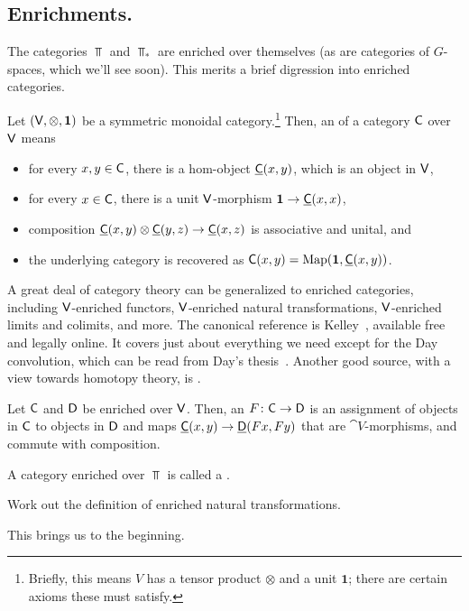 \subsection*{Enrichments.}
The categories $\Top$ and $\Top_*$ are enriched over themselves (as are categories of $G$-spaces, which we'll see
soon). This merits a brief digression into enriched categories.
\begin{defn}
Let $(\mathsf V,\otimes, \boldsymbol 1)$ be a symmetric monoidal
category.\footnote{Briefly, this means $V$ has a tensor product $\otimes$ and a unit $\boldsymbol 1$; there are
certain axioms these must satisfy.} Then, an  of a category $\mathsf C$ over $\mathsf V$
means
\begin{itemize}
	\item for every $x,y\in\mathsf C$, there is a hom-object $\underline{\mathsf C}(x,y)$, which is an object in $\mathsf V$,
	\item for every $x\in\mathsf C$, there is a unit $\mathsf V$-morphism $\boldsymbol 1\to\underline{\mathsf C}(x,x)$,
	\item composition $\underline{\mathsf C}(x,y)\otimes\underline{\mathsf C}(y,z)\to\underline{\mathsf C}(x,z)$ is associative and unital,
	and
	\item the underlying category is recovered as $\mathsf C(x,y) = \operatorname{Map}(\boldsymbol 1, \underline{\mathsf C}(x,y))$.
\end{itemize}
\end{defn}
A great deal of category theory can be generalized to enriched categories, including $\mathsf V$-enriched functors,
$\mathsf V$-enriched natural transformations, $\mathsf V$-enriched limits and colimits, and more. The canonical reference is
Kelley~\cite{Kelley}, available free and legally online. It covers just about everything we need except for the Day
convolution, which can be read from Day's thesis~\cite{DayThesis}. Another good source, with
a view towards homotopy theory, is \cite[Chapter 3]{RiehlCHT}.
\begin{defn}
Let $\mathsf C$ and $\mathsf D$ be enriched over $\mathsf V$. Then, an  $F\colon\mathsf C\to\mathsf D$ is an assignment
of objects in $\mathsf C$ to objects in $\mathsf D$ and maps $\underline{\mathsf C}(x,y)\to\underline{\mathsf D}(Fx, Fy)$ that are $\cat
V$-morphisms, and commute with composition.
\end{defn}
A category enriched over $\Top$ is called a .
\begin{ex}
Work out the definition of enriched natural transformations.
\end{ex}
This brings us to the beginning.
